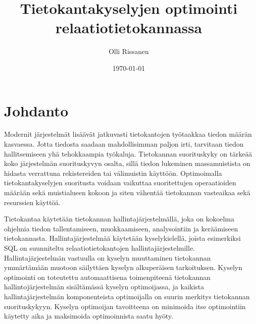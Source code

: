 \documentclass[finnish]{tktltiki2}
\title{Tietokantakyselyjen optimointi relaatiotietokannassa}
\author{Olli Rissanen}
\date{\today}
\theoremstyle{definition}
\theoremstyle{remark}
\begin{document}

\maketitle
\makeabstract
\tableofcontents
\newpage


\section{Johdanto}
Modernit järjestelmät lisäävät jatkuvasti tietokantojen työtaakkaa tiedon määrän kasvaessa. Jotta tiedosta saadaan mahdollisimman paljon irti, tarvitaan tiedon hallitsemiseen yhä tehokkaampia työkaluja. %
Tietokannan suorituskyky on tärkeää koko järjestelmän suorituskyvyn osalta, sillä tiedon lukeminen massamuistista on hidasta verrattuna rekistereiden tai välimuistin käyttöön. Optimoimalla tietokantakyselyjen suoritusta voidaan vaikuttaa suoritettujen operaatioiden määrään sekä muistialueen kokoon ja siten vähentää tietokannan vasteaikaa sekä resurssien käyttöä. \cite{mor2012}
	
% 

Tietokantaa käytetään tietokannan hallintajärjestelmällä, joka on kokoelma ohjelmia tiedon tallentamiseen, muokkaamiseen, analysointiin ja keräämiseen tietokannasta. Hallintajärjestelmää käytetään kyselykielellä, joista esimerkiksi SQL on suunniteltu relaatiotietokantojen hallintajärjestelmille. Hallintajärjestelmän vastuulla on kyselyn muuttaminen tietokannan ymmärtämään muotoon säilyttäen kyselyn alkuperäisen tarkoituksen. Kyselyn optimointi on toteutettu automaattisena toimenpiteenä tietokannan hallintojärjestelmän sisältämässä kyselyn optimoijassa, ja kaikista hallintajärjestelmän komponenteista optimoijalla on suurin merkitys tietokannan suorituskykyyn. \cite{mor2012} Kyselyn optimoijan tavoitteena on minimoida itse optimointiin käytetty aika ja maksimoida optimoinnista saatu hyöty. \cite{jarke1984} 
\end{document}
